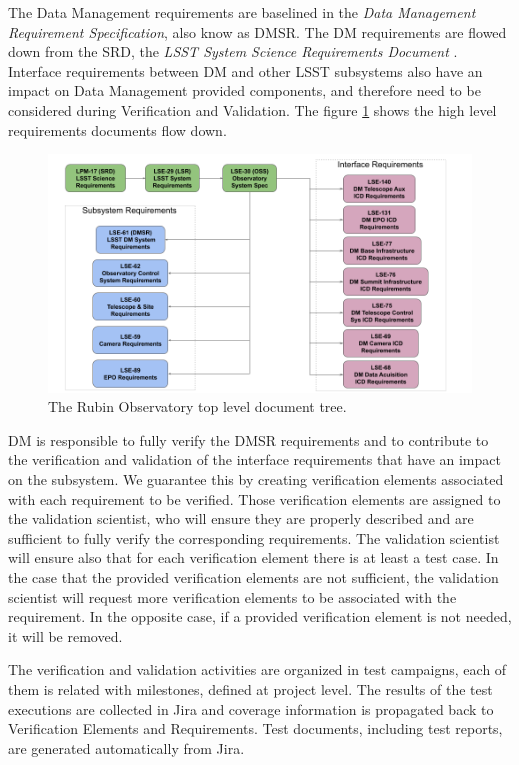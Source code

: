 The Data Management requirements are baselined in the \textit{Data Management Requirement Specification}\cite{LSE-61}, also know as DMSR.
The DM requirements are flowed down from the SRD, the \textit{LSST System Science Requirements Document} \cite{LPM-17}. 
Interface requirements between DM and other LSST subsystems also have an impact on Data Management provided components, 
and therefore need to be considered during Verification and Validation. 
The figure \ref{fig:topdoctree} shows the high level requirements documents flow down.

\begin{figure}
\begin{center}
\includegraphics[width=\textwidth]{imgs/TopLevelDocTree.png}
 \caption{The Rubin Observatory top level document tree.}
 \label{fig:topdoctree}
\end{center}
\end{figure}

DM is responsible to fully verify the DMSR requirements and to contribute to the verification and validation of the interface requirements that have an impact on the subsystem.
We guarantee this by creating verification elements associated with each requirement to be verified.
Those verification elements are assigned to the validation scientist, 
who will ensure they are properly described and are sufficient to fully verify the corresponding requirements. 
The validation scientist will ensure also that for each verification element there is at least a test case.
In the case that the provided verification elements are not sufficient, the validation scientist will request more verification elements to be associated with the requirement.
In the opposite case, if a provided verification element is not needed, it will be removed.

The verification and validation activities are organized in test campaigns, each of them is related with milestones, defined at project level.
The results of the test executions are collected in Jira and coverage information is propagated back to Verification Elements and Requirements.
Test documents, including test reports, are generated automatically from Jira.

